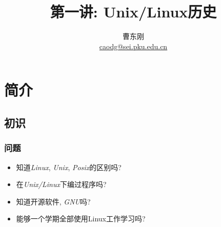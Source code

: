 \documentclass[compress]{beamer}
\begin{document}
					
\title{第一讲: Unix/Linux历史}

\author[\href{http://c.pku.edu.cn/}{http://c.pku.edu.cn/}]
{曹东刚\\\href{mailto:caodg@sei.pku.edu.cn}{caodg@sei.pku.edu.cn}}


\date{}


\begin{frame}
	\titlepage
\end{frame}

\section{简介}

\subsection{初识}

\begin{frame}
\frametitle{问题}
\begin{itemize}
    \item 知道\emph{Linux}, \emph{Unix}, \emph{Posix}的区别吗?
    \item 在\emph{Unix/Linux}下编过程序吗? 
	\item 知道开源软件, \emph{GNU}吗?
	\item 能够一个学期全部使用Linux工作学习吗?
\end{itemize}
\end{frame}
\end{document}
